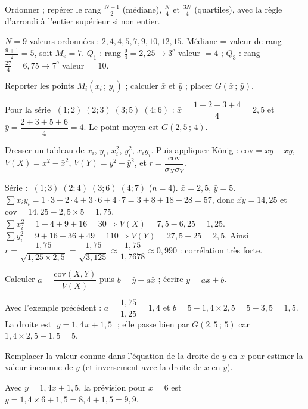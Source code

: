 Ordonner ; repérer le rang $\frac{N+1}2$ (médiane), $\frac N4$ et $\frac{3N}4$
(quartiles), avec la règle d'arrondi à l'entier supérieur si non entier.
\begin{exemple}
$N=9$ valeurs ordonnées : $2,4,4,5,7,9,10,12,15$. Médiane = valeur de rang
$\frac{9+1}2=5$, soit $M_e=7$. $Q_1$ : rang $\frac94=2{,}25\to 3^{\text{e}}$ valeur $=4$ ;
$Q_3$ : rang $\frac{27}4=6{,}75\to 7^{\text{e}}$ valeur $=10$.
\end{exemple}

Reporter les points $M_i(x_i\,;\,y_i)$ ; calculer $\bar x$ et $\bar y$ ; placer $G(\bar x\,;\,\bar y)$.
\begin{exemple}
Pour la série $\;(1;2)\;(2;3)\;(3;5)\;(4;6)$ : $\bar x=\dfrac{1+2+3+4}{4}=2{,}5$ et
$\bar y=\dfrac{2+3+5+6}{4}=4$. Le point moyen est $G(2{,}5\,;\,4)$.
\end{exemple}

Dresser un tableau de $x_i$, $y_i$, $x_i^2$, $y_i^2$, $x_iy_i$. Puis appliquer König :
$\mathrm{cov}=\overline{xy}-\bar x\bar y$, $V(X)=\overline{x^2}-\bar x^2$, $V(Y)=\overline{y^2}-\bar y^2$, et $r=\dfrac{\mathrm{cov}}{\sigma_X\sigma_Y}$.
\begin{exemple}
Série : $\;(1;3)\;(2;4)\;(3;6)\;(4;7)$ ($n=4$).
$\bar x=2{,}5$, $\bar y=5$.
$\sum x_iy_i=1\!\cdot\!3+2\!\cdot\!4+3\!\cdot\!6+4\!\cdot\!7=3+8+18+28=57$, donc
$\overline{xy}=14{,}25$ et $\mathrm{cov}=14{,}25-2{,}5\times5=1{,}75$.
$\sum x_i^2=1+4+9+16=30\Rightarrow V(X)=7{,}5-6{,}25=1{,}25$.
$\sum y_i^2=9+16+36+49=110\Rightarrow V(Y)=27{,}5-25=2{,}5$.
Ainsi $r=\dfrac{1{,}75}{\sqrt{1{,}25\times2{,}5}}=\dfrac{1{,}75}{\sqrt{3{,}125}}\approx\dfrac{1{,}75}{1{,}7678}\approx0{,}990$ : corrélation très forte.
\end{exemple}

Calculer $a=\dfrac{\mathrm{cov}(X,Y)}{V(X)}$ puis $b=\bar y-a\bar x$ ; écrire $y=ax+b$.
\begin{exemple}
Avec l'exemple précédent : $a=\dfrac{1{,}75}{1{,}25}=1{,}4$ et $b=5-1{,}4\times2{,}5=5-3{,}5=1{,}5$.
La droite est $\;y=1{,}4\,x+1{,}5\;$ ; elle passe bien par $G(2{,}5\,;\,5)$ car $1{,}4\times2{,}5+1{,}5=5$.
\end{exemple}

Remplacer la valeur connue dans l'équation de la droite de $y$ en $x$ pour estimer la valeur
inconnue de $y$ (et inversement avec la droite de $x$ en $y$).
\begin{exemple}
Avec $y=1{,}4x+1{,}5$, la prévision pour $x=6$ est $y=1{,}4\times6+1{,}5=8{,}4+1{,}5=9{,}9$.
\end{exemple}

